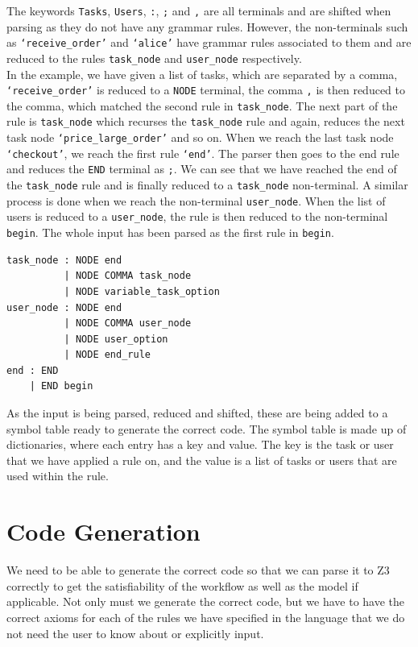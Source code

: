 \documentclass[a4paper]{report}
\begin{document}
The keywords \texttt{Tasks}, \texttt{Users}, \texttt{:}, \texttt{;} and \texttt{,} are all terminals and are shifted when parsing as they do not have any grammar rules. However, the non-terminals such as \texttt{`receive\_order'} and \texttt{`alice'} have grammar rules associated to them and are reduced to the rules \texttt{task\_node} and \texttt{user\_node} respectively. \\

In the example, we have given a list of tasks, which are separated by a comma, \texttt{`receive\_order'} is reduced to a \texttt{NODE} terminal, the comma \texttt{,} is then reduced to the comma, which matched the second rule in \texttt{task\_node}. The next part of the rule is \texttt{task\_node} which recurses the \texttt{task\_node} rule and again, reduces the next task node \texttt{`price\_large\_order'} and so on. When we reach the last task node \texttt{`checkout'}, we reach the first rule \texttt{`end'}. The parser then goes to the end rule and reduces the \texttt{END} terminal as \texttt{;}. We can see that we have reached the end of the \texttt{task\_node} rule and is finally reduced to a \texttt{task\_node} non-terminal. A similar process is done when we reach the non-terminal \texttt{user\_node}. When the list of users is reduced to a \texttt{user\_node}, the rule is then reduced to the non-terminal \texttt{begin}. The whole input has been parsed as the first rule in \texttt{begin}.
\begin{lstlisting}[frame=single]
task_node : NODE end
          | NODE COMMA task_node
          | NODE variable_task_option
user_node : NODE end
          | NODE COMMA user_node
          | NODE user_option
          | NODE end_rule
end : END
    | END begin
\end{lstlisting}

As the input is being parsed, reduced and shifted, these are being added to a symbol table ready to generate the correct code. The symbol table is made up of dictionaries, where each entry has a key and value. The key is the task or user that we have applied a rule on, and the value is a list of tasks or users that are used within the rule. \\

\section{Code Generation}
We need to be able to generate the correct code so that we can parse it to Z3 correctly to get the satisfiability of the workflow as well as the model if applicable. Not only must we generate the correct code, but we have to have the correct axioms for each of the rules we have specified in the language that we do not need the user to know about or explicitly input.\\
\end{document}
